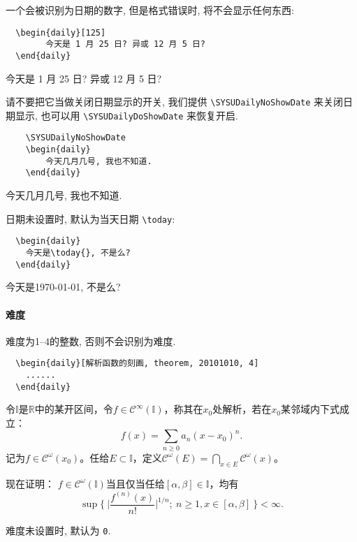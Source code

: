 \documentclass{SYSUDaily}
\begin{document}
一个会被识别为日期的数字, 但是格式错误时, 将不会显示任何东西:
\begin{multicols}{2}
	\begin{lstlisting}
  \begin{daily}[125]
		今天是 1 月 25 日? 异或 12 月 5 日?
  \end{daily}
  \end{lstlisting}
	\small
	\begin{daily}[125]
		今天是 1 月 25 日? 异或 12 月 5 日?
	\end{daily}
\end{multicols}
请不要把它当做关闭日期显示的开关, 我们提供 \verb|\SYSUDailyNoShowDate| 来关闭日期显示, 也可以用 \verb|\SYSUDailyDoShowDate| 来恢复开启.
\begin{multicols}{2}
	\begin{lstlisting}
	\SYSUDailyNoShowDate
	\begin{daily}
		今天几月几号, 我也不知道.
	\end{daily}
  \end{lstlisting}
	\small
	\SYSUDailyNoShowDate
	\begin{daily}
		今天几月几号, 我也不知道.
	\end{daily}
\end{multicols}
\SYSUDailyDoShowDate
日期未设置时, 默认为当天日期 \verb|\today|: 
\begin{multicols}{2}
	\begin{lstlisting}
  \begin{daily}
    今天是\today{}, 不是么?
  \end{daily}
  \end{lstlisting}
	\small
	\begin{daily}
		今天是\today{}, 不是么?
	\end{daily}
\end{multicols}



\paragraph{难度}
难度为1--4的整数, 否则不会识别为难度.
\begin{lstlisting}
  \begin{daily}[解析函数的刻画, theorem, 20101010, 4]
    ......
  \end{daily}
\end{lstlisting}
\begin{daily}
	令$\mathbb I$是$\mathbb R$中的某开区间，令$f\in \mathscr{C}^\infty(\mathbb  I)$，称其在$x_0$处解析，若在$x_0$某邻域内下式成立：
	$$
	f(x) = \sum_{n\geqslant0} a_n(x-x_0)^n.
	$$
	记为$f\in \mathscr{C}^\omega(x_0)$。任给$E\subset \mathbb I$，定义$\mathscr{C}^\omega(E)=\bigcap_{x\in E}\mathscr{C}^\omega(x)$。

	现在证明：
	$f\in \mathscr{C}^\omega(\mathbb I)$当且仅当任给$[\alpha,\beta]\in \mathbb I$，均有
	\[
			\sup\biggl\{~\biggl| \frac{f^{(n)}(x)}{n!} \biggr|^{1/n}\!;~n\geqslant 1, x\in [\alpha,\beta] ~\biggr\}   <\infty.
	\]
\end{daily}
难度未设置时, 默认为 \verb|0|.
\end{document}
